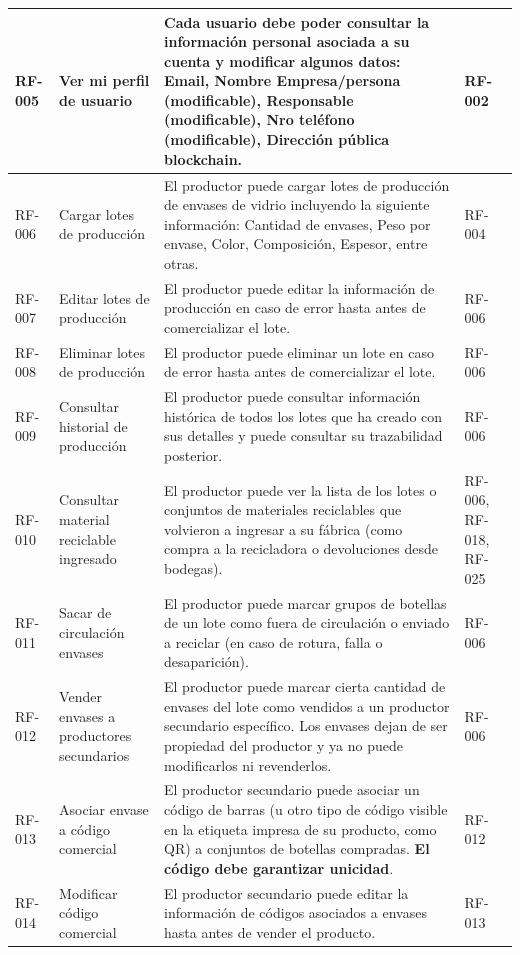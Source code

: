 \begin{xltabular}{\textwidth}{@{} L{1.5cm} L{2.5cm} Y L{1.5cm} @{}}
	\hline
	RF-005 & Ver mi perfil de usuario & Cada usuario debe poder consultar la información personal asociada a su cuenta y modificar algunos datos: Email, Nombre Empresa/persona (modificable), Responsable (modificable), Nro teléfono (modificable), Dirección pública blockchain. & RF-002 \\
	\hline
	RF-006 & Cargar lotes de producción & El productor puede cargar lotes de producción de envases de vidrio incluyendo la siguiente información: Cantidad de envases, Peso por envase, Color, Composición, Espesor, entre otras. & RF-004 \\
	\hline
	RF-007 & Editar lotes de producción & El productor puede editar la información de producción en caso de error hasta antes de comercializar el lote. & RF-006 \\
	\hline
	RF-008 & Eliminar lotes de producción & El productor puede eliminar un lote en caso de error hasta antes de comercializar el lote. & RF-006 \\
	\hline
	RF-009 & Consultar historial de producción & El productor puede consultar información histórica de todos los lotes que ha creado con sus detalles y puede consultar su \gls{trazabilidad} posterior. & RF-006 \\
	\hline
	RF-010 & Consultar material reciclable ingresado & El productor puede ver la lista de los lotes o conjuntos de materiales reciclables que volvieron a ingresar a su fábrica (como compra a la recicladora o devoluciones desde bodegas). & RF-006, RF-018, RF-025 \\
	\hline
	RF-011 & Sacar de circulación envases & El productor puede marcar grupos de botellas de un lote como fuera de circulación o enviado a reciclar (en caso de rotura, falla o desaparición). & RF-006 \\
	\hline
	RF-012 & Vender envases a productores secundarios & El productor puede marcar cierta cantidad de envases del lote como vendidos a un productor secundario específico. Los envases dejan de ser propiedad del productor y ya no puede modificarlos ni revenderlos. & RF-006 \\
	\hline
	RF-013 & Asociar envase a código comercial & El productor secundario puede asociar un código de barras (u otro tipo de código visible en la etiqueta impresa de su producto, como QR) a conjuntos de botellas compradas. \textbf{El código debe garantizar unicidad}. & RF-012 \\
	\hline
	RF-014 & Modificar código comercial & El productor secundario puede editar la información de códigos asociados a envases hasta antes de vender el producto. & RF-013 \\

\end{xltabular}
